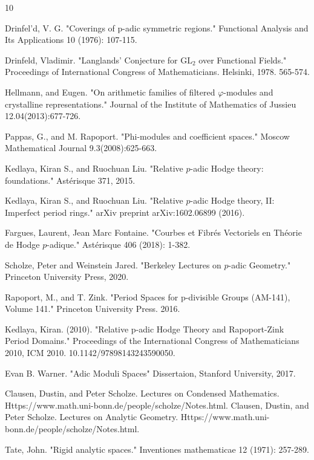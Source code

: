 \documentclass[12pt]{article}
\theoremstyle{definition}
\numberwithin{equation}{section}
\begin{document}
\newpage

\begin{thebibliography}{10}

 Drinfel'd, V. G. "Coverings of p-adic symmetric regions." Functional Analysis and Its Applications 10 (1976): 107-115.

 Drinfeld, Vladimir. "Langlands' Conjecture for $\mathrm{GL}_2$ over Functional Fields." Proceedings of International Congress of Mathematicians. Helsinki, 1978. 565-574.

 Hellmann, and Eugen. "On arithmetic families of filtered $\varphi$-modules and crystalline representations." Journal of the Institute of Mathematics of Jussieu 12.04(2013):677-726.

  Pappas, G., and  M. Rapoport. "Phi-modules and coefficient spaces." Moscow Mathematical Journal 9.3(2008):625-663.

 Kedlaya, Kiran S., and Ruochuan Liu. "Relative $p$-adic Hodge theory: foundations." Ast\'erisque 371, 2015.

 Kedlaya, Kiran S., and Ruochuan Liu. "Relative $p$-adic Hodge theory, II: Imperfect period rings." arXiv preprint arXiv:1602.06899 (2016).

 Fargues, Laurent, Jean Marc Fontaine. "Courbes et Fibr\'es Vectoriels en Th\'eorie de Hodge $p$-adique." Ast\'erisque 406 (2018): 1-382.

 Scholze, Peter and Weinstein Jared. "Berkeley Lectures on $p$-adic Geometry." Princeton University Press, 2020.


 Rapoport, M., and  T. Zink. "Period Spaces for p-divisible Groups (AM-141), Volume 141." Princeton University Press. 2016.

 Kedlaya, Kiran. (2010). "Relative p-adic Hodge Theory and Rapoport-Zink Period Domains." Proceedings of the International Congress of Mathematicians 2010, ICM 2010. 10.1142/97898143243590050.

 Evan B. Warner. "Adic Moduli Spaces" Dissertaion, Stanford University, 2017.
 
 Clausen, Dustin, and Peter Scholze. Lectures on Condensed Mathematics. Https://www.math.uni-bonn.de/people/scholze/Notes.html.
 Clausen, Dustin, and Peter Scholze. Lectures on Analytic Geometry. Https://www.math.uni-bonn.de/people/scholze/Notes.html.

 Tate, John. "Rigid analytic spaces." Inventiones mathematicae 12 (1971): 257-289.


\end{thebibliography}
\end{document}
